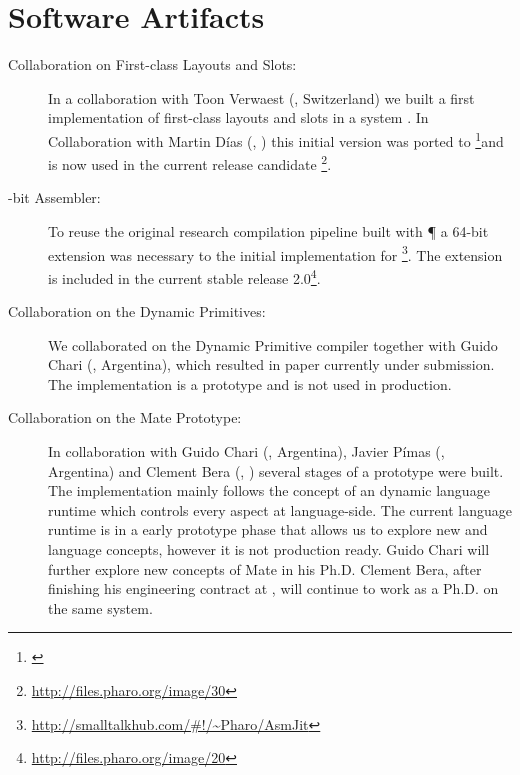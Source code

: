 \section{Software Artifacts}
\begin{description}
	\item[Collaboration on First-class Layouts and Slots:]
		In a collaboration with Toon Verwaest (\SCG, Switzerland) we built a first implementation of first-class layouts and slots in a \ST system \cite{Verw11a}.
		In Collaboration with Martin Días (\RMoD, \INRIA) this initial version was ported to \PH\footnote{\url{}}and is now used in the current release candidate \footnote{\url{http://files.pharo.org/image/30}}.

	\item[-bit Assembler:]
		To reuse the original research compilation pipeline built with \P \cite{Verw10a, Brun11a} a 64-bit extension was necessary to the initial \AsmJIT implementation for \PH\footnote{\url{http://smalltalkhub.com/\#!/~Pharo/AsmJit}}.
		The extension is included in the current stable \PH release 2.0\footnote{\url{http://files.pharo.org/image/20}}.

	\item[Collaboration on the \WF Dynamic Primitives:]
		We collaborated on the \WF Dynamic Primitive compiler together with Guido Chari (\UBA, Argentina), which resulted in paper currently under submission\cite{Char13a}.
		The implementation is a prototype and is not used in production.

	\item[Collaboration on the Mate \VM Prototype:]
		In collaboration with Guido Chari (\UBA, Argentina), Javier Pímas (\UBA, Argentina) and Clement Bera (\RMoD, \INRIA) several stages of a prototype \VM were built.
		The implementation mainly follows the concept of an dynamic language runtime which controls every aspect at language-side.
		The current language runtime is in a early prototype phase that allows us to explore new \VM and language concepts, however it is not production ready.
		Guido Chari will further explore new concepts of Mate in his Ph.D.
		Clement Bera, after finishing his engineering contract at \RMoD, will continue to work as a Ph.D. on the same system.


\end{description}
